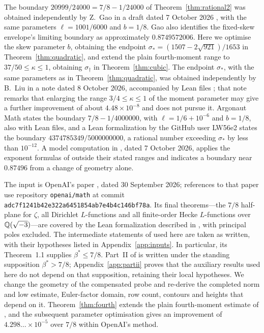 The boundary $20999/24000=7/8-1/24000$ of Theorem~\ref{thm:rational2} was obtained independently by Z.~Gao in a draft dated 7 October 2026 \cite{gao2026}, with the same parameters $\ell=1001/6000$ and $b=1/8$. Gao also identifies the fixed-skew envelope's limiting boundary as approximately $0.8749572006$. Here we optimise the skew parameter $b$, obtaining the endpoint $\sigma_*=(1507-2\sqrt{921})/1653$ in Theorem~\ref{thm:quadratic}, and extend the plain fourth-moment range to $37/50\le\kappa\le1$, obtaining $\sigma_\dagger$ in Theorem~\ref{thm:cubic}. The endpoint $\sigma_*$, with the same parameters as in Theorem~\ref{thm:quadratic}, was obtained independently by B.~Liu in a note dated 8 October 2026, accompanied by Lean files \cite{liu2026}; that note remarks that enlarging the range $3/4\le\kappa\le1$ of the moment parameter may give a further improvement of about $4.48\times10^{-8}$ and does not pursue it. Argonaut Math \cite{argonaut2026} states the boundary $7/8-1/4000000$, with $\ell=1/6+10^{-6}$ and $b=1/8$, also with Lean files, and a Lean formalization by the GitHub user LW56e2 \cite{lw2026} states the boundary $4374785349/5000000000$, a rational number exceeding $\sigma_*$ by less than $10^{-12}$. A model computation in \cite{tomoto2026}, dated 7 October 2026, applies the exponent formulas of \cite{openai2026q} outside their stated ranges and indicates a boundary near $0.87496$ from a change of geometry alone.

The input is OpenAI's paper \cite{openai2026q}, dated 30 September 2026; references to that paper use repository \nolinkurl{openai/math} at commit \nolinkurl{adc7f1241b42e322a6451854ab7e4b4c146bf78a}. Its final theorems---the $7/8$ half-plane for $\zeta$, all Dirichlet $L$-functions and all finite-order Hecke $L$-functions over $\mathbb Q(\sqrt{-3})$---are covered by the Lean formalization described in \cite{openai2026lean}, with principal poles excluded. The intermediate statements of \cite{openai2026q} used here are taken as written, with their hypotheses listed in Appendix~\ref{app:inputs}. In particular, its Theorem~1.1 supplies $\beta^*\le7/8$. Part~II of \cite{openai2026q} is written under the standing supposition $\beta^*>7/8$; Appendix~\ref{app:partii} proves that the auxiliary results used here do not depend on that supposition, retaining their local hypotheses. We change the geometry of the compensated probe and re-derive the completed norm and low estimate, Euler-factor domain, row count, contours and heights that depend on it. Theorem~\ref{thm:fourth} extends the plain fourth-moment estimate of , and the subsequent parameter optimisation gives an improvement of $4.298\ldots\times10^{-5}$ over $7/8$ within OpenAI's method.


